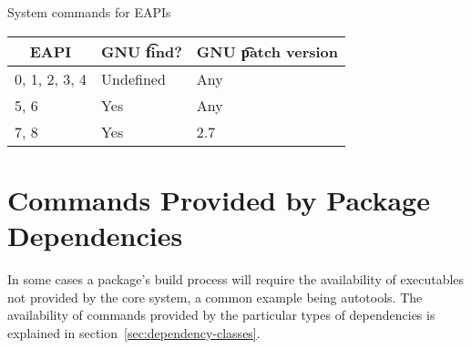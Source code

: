 \begin{centertable}{System commands for EAPIs}
    \label{tab:system-commands-table}
    \begin{tabular}{lll}
      \toprule
      \multicolumn{1}{c}{\textbf{EAPI}} &
      \multicolumn{1}{c}{\textbf{GNU \t{find}?}} &
      \multicolumn{1}{c}{\textbf{GNU \t{patch} version}} \\
      \midrule
      0, 1, 2, 3, 4     & Undefined & Any \\
      5, 6              & Yes       & Any \\
      7, 8              & Yes       & 2.7 \\
      \bottomrule
    \end{tabular}
\end{centertable}

\section{Commands Provided by Package Dependencies}

In some cases a package's build process will require the availability of executables not provided by
the core system, a common example being autotools. The availability of commands provided by the
particular types of dependencies is explained in section~\ref{sec:dependency-classes}.




